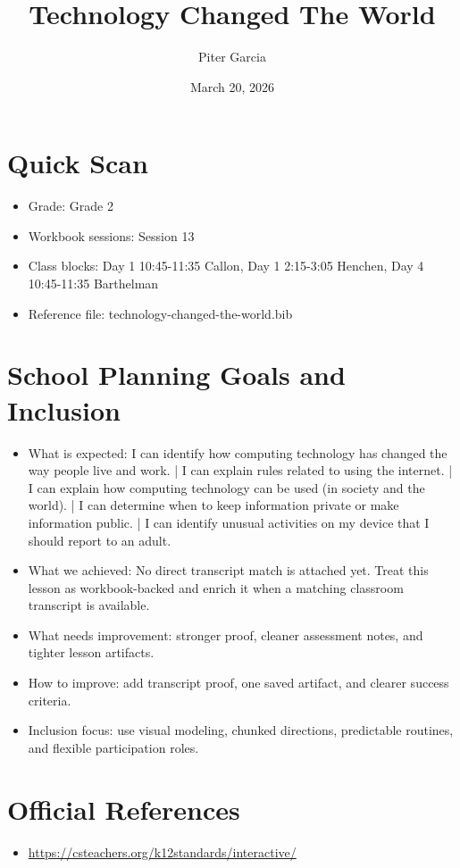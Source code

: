 \documentclass[11pt]{article}
\title{Technology Changed The World}
\author{Piter Garcia}
\date{March 20, 2026}
\begin{document}
\maketitle
\section*{Quick Scan}
\begin{itemize}[leftmargin=*]
\item Grade: Grade 2
\item Workbook sessions: Session 13
\item Class blocks: Day 1 10:45-11:35 Callon, Day 1 2:15-3:05 Henchen, Day 4 10:45-11:35 Barthelman
\item Reference file: technology-changed-the-world.bib
\end{itemize}
\section*{School Planning Goals and Inclusion}
\begin{itemize}[leftmargin=*]
\item What is expected: I can identify how computing technology has changed the way people live and work. | I can explain rules related to using the internet. | I can explain how computing technology can be used (in society and the world). | I can determine when to keep information private or make information public. | I can identify unusual activities on my device that I should report to an adult.
\item What we achieved: No direct transcript match is attached yet. Treat this lesson as workbook-backed and enrich it when a matching classroom transcript is available.
\item What needs improvement: stronger proof, cleaner assessment notes, and tighter lesson artifacts.
\item How to improve: add transcript proof, one saved artifact, and clearer success criteria.
\item Inclusion focus: use visual modeling, chunked directions, predictable routines, and flexible participation roles.
\end{itemize}
\section*{Official References}
\begin{itemize}[leftmargin=*]
\item \url{https://csteachers.org/k12standards/interactive/}

\end{itemize}
\end{document}
